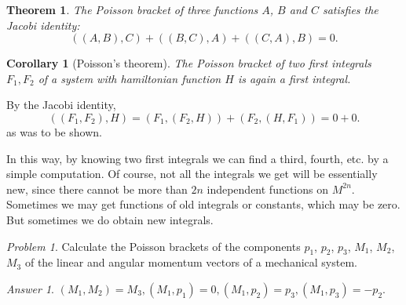 \documentclass[leqno]{book}
\numberwithin{equation}{section}
\theoremstyle{plain}
\newtheorem*{thm*}{Theorem}
\newtheorem*{cor*}{Corollary}
\let\oldendproof\endproof
\renewenvironment{proof}[1][\proofname]{%
  \oldproof[\textsc{#1}]%
}{\oldendproof}
\theoremstyle{definition}
\theoremstyle{remark}
\theoremstyle{smallcap}
\newtheorem*{prob*}{Problem}
\numberwithin{prob}{section}
\newtheorem*{ans*}{Answer}
\begin{document}
\begin{thm*}
  The Poisson bracket of three functions $A$, $B$ and $C$
  satisfies the Jacobi identity:
  $$
  ((A, B), C) + ((B, C), A) + ((C, A), B) = 0.
  $$
\end{thm*}

\begin{cor*}[Poisson's theorem]
  The Poisson bracket of two first integrals $F_1, F_2$
  of a system with hamiltonian function $H$
  is again a first integral.
\end{cor*}

\begin{proof}[Proof of the corollary]
  By the Jacobi identity,
  $$
  ((F_1, F_2), H)
  =
  (F_1, (F_2, H))
  +
  (F_2, (H, F_1)) = 0 + 0.
  $$
  as was to be shown.
\end{proof}

In this way, by knowing two first integrals we can find a third, fourth, etc.
by a simple computation.
%
Of course, not all the integrals we get will be essentially new,
since there cannot be more than $2n$ independent functions on $M^{2n}$.
%
Sometimes we may get functions of old integrals or constants,
which may be zero.
%
But sometimes we do obtain new integrals.

\begin{prob*}
  Calculate the Poisson brackets of the components
  $p_1$, $p_2$, $p_3$, $M_1$, $M_2$, $M_3$ of the
  linear and angular momentum vectors of
  a mechanical system.

  \begin{ans*}
    $(M_1, M_2) = M_3, (M_1, p_1) = 0, (M_1, p_2) = p_3, (M_1, p_3) = -p_2.$
  \end{ans*}

\end{prob*}
\end{document}
